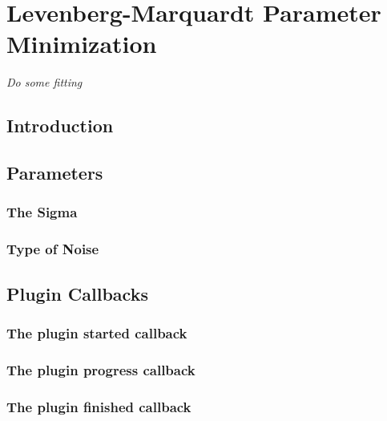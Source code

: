 \chapter{Levenberg-Marquardt Parameter Minimization}
\emph{Do some fitting}
\section{Introduction}
\section{Parameters}
\subsection{The Sigma}
\subsection{Type of Noise}
\section{Plugin Callbacks}
\subsection{The plugin started callback}
\subsection{The plugin progress callback}
\subsection{The plugin finished callback}
